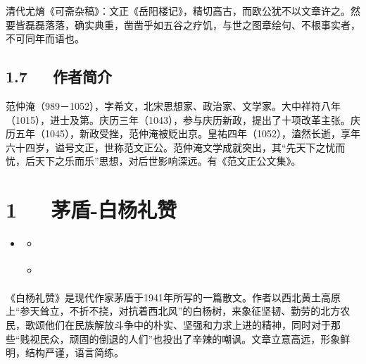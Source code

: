 \documentclass[letterpaper,10pt,english]{sphinxmanual}
\begin{document}
清代尤焴《可斋杂稿》：文正《岳阳楼记》，精切高古，而欧公犹不以文章许之。然要皆磊磊落落，确实典重，凿凿乎如五谷之疗饥，与世之图章绘句、不根事实者，不可同年而语也。


\section{1.7   作者简介}
\label{\detokenize{p01_u6563_u6587/_u8303_u4ef2_u6df9-_u5cb3_u9633_u697c_u8bb0:id9}}
范仲淹（989－1052），字希文，北宋思想家、政治家、文学家。大中祥符八年（1015），进士及第。庆历三年（1043），参与庆历新政，提出了十项改革主张。庆历五年（1045），新政受挫，范仲淹被贬出京。皇祐四年（1052），溘然长逝，享年六十四岁，谥号文正，世称范文正公。范仲淹文学成就突出，其“先天下之忧而忧，后天下之乐而乐”思想，对后世影响深远。有《范文正公文集》。


\chapter{1   茅盾-白杨礼赞}
\label{\detokenize{p01_u6563_u6587/_u8305_u76fe-_u767d_u6768_u793c_u8d5e:id1}}\label{\detokenize{p01_u6563_u6587/_u8305_u76fe-_u767d_u6768_u793c_u8d5e::doc}}
\begin{sphinxShadowBox}
\begin{itemize}
\item {} 
\label{\detokenize{p01_u6563_u6587/_u8305_u76fe-_u767d_u6768_u793c_u8d5e:id5}}{\hyperref[\detokenize{p01_u6563_u6587/_u8305_u76fe-_u767d_u6768_u793c_u8d5e:id1}]{}}
\begin{itemize}
\item {} 
\label{\detokenize{p01_u6563_u6587/_u8305_u76fe-_u767d_u6768_u793c_u8d5e:id6}}{\hyperref[\detokenize{p01_u6563_u6587/_u8305_u76fe-_u767d_u6768_u793c_u8d5e:id3}]{}}

\item {} 
\label{\detokenize{p01_u6563_u6587/_u8305_u76fe-_u767d_u6768_u793c_u8d5e:id7}}{\hyperref[\detokenize{p01_u6563_u6587/_u8305_u76fe-_u767d_u6768_u793c_u8d5e:id4}]{}}

\end{itemize}

\end{itemize}
\end{sphinxShadowBox}

《白杨礼赞》是现代作家茅盾于1941年所写的一篇散文。作者以西北黄土高原上“参天耸立，不折不挠，对抗着西北风”的白杨树，来象征坚韧、勤劳的北方农民，歌颂他们在民族解放斗争中的朴实、坚强和力求上进的精神，同时对于那些“贱视民众，顽固的倒退的人们”也投出了辛辣的嘲讽。文章立意高远，形象鲜明，结构严谨，语言简练。
\end{document}
